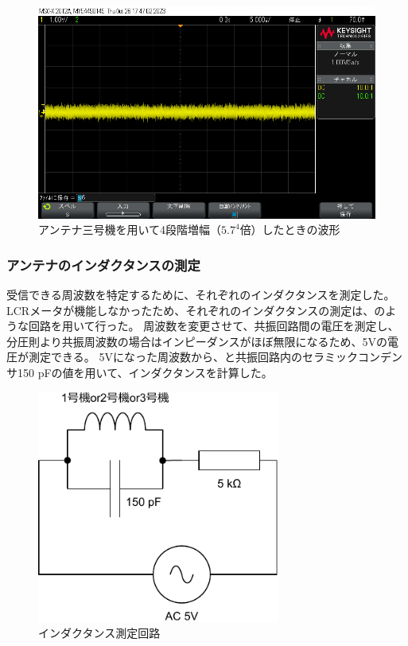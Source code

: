 \documentclass[report.tex]{subfiles}
\begin{document}
\begin{figure}[H]
	\centering
	\includegraphics[width=14cm]{use/s6.png}
	\caption{アンテナ三号機を用いて4段階増幅（\(5.7^4\)倍）したときの波形}
	\label{fig:insda5}
\end{figure}

\subsubsection{アンテナのインダクタンスの測定}

受信できる周波数を特定するために、それぞれのインダクタンスを測定した。
LCRメータが機能しなかったため、それぞれのインダクタンスの測定は、のような回路を用いて行った。
周波数を変更させて、共振回路間の電圧を測定し、分圧則より共振周波数の場合はインピーダンスがほぼ無限になるため、5Vの電圧が測定できる。
5Vになった周波数から、と共振回路内のセラミックコンデンサ150 pFの値を用いて、インダクタンスを計算した。

\begin{figure}[H]
	\centering
	\includegraphics[width=8cm]{fig/inda.pdf}
	\caption{インダクタンス測定回路}
	\label{fig:inda}
\end{figure}
\end{document}
